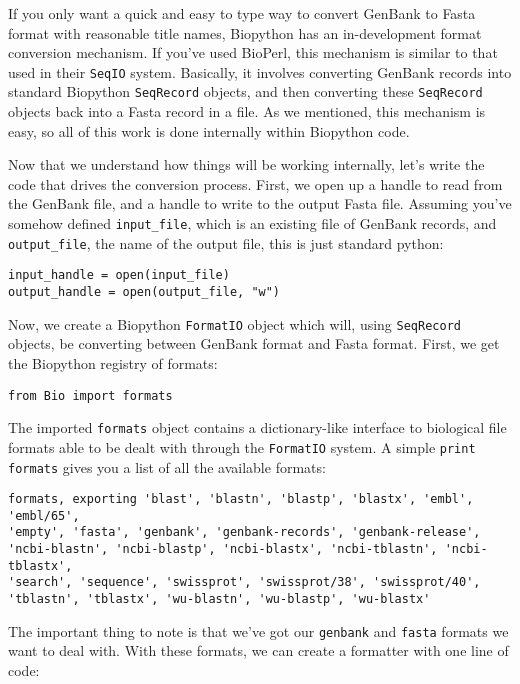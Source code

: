 \documentclass{article}
\begin{document}
If you only want a quick and easy to type way to convert GenBank to
Fasta format with reasonable title names, Biopython has an
in-development format conversion mechanism. If you've used BioPerl, this
mechanism is similar to that used in their \verb|SeqIO| system.
Basically, it involves converting GenBank records into standard
Biopython \verb|SeqRecord| objects, and then converting these
\verb|SeqRecord| objects back into a Fasta record in a file. As we
mentioned, this mechanism is easy, so all of this work is done
internally within Biopython code.

Now that we understand how things will be working internally, let's 
write the code that drives the conversion process.
First, we open up a handle to read from the GenBank file, and a handle
to write to the output Fasta file. Assuming you've somehow defined
\verb|input_file|, which is an existing file of GenBank records, and
\verb|output_file|, the name of the output file, this is just standard python:

\begin{verbatim}
input_handle = open(input_file)
output_handle = open(output_file, "w")
\end{verbatim}

Now, we create a Biopython \verb|FormatIO| object which will, using
\verb|SeqRecord| objects, be converting between GenBank format and Fasta
format. First, we get the Biopython registry of formats:

\begin{verbatim}
from Bio import formats
\end{verbatim}

The imported \verb|formats| object contains a dictionary-like interface to
biological file formats able to be dealt with through the
\verb|FormatIO| system. A simple \verb|print formats| gives you a list
of all the available formats:

\begin{verbatim}
formats, exporting 'blast', 'blastn', 'blastp', 'blastx', 'embl', 'embl/65', 
'empty', 'fasta', 'genbank', 'genbank-records', 'genbank-release', 
'ncbi-blastn', 'ncbi-blastp', 'ncbi-blastx', 'ncbi-tblastn', 'ncbi-tblastx', 
'search', 'sequence', 'swissprot', 'swissprot/38', 'swissprot/40', 
'tblastn', 'tblastx', 'wu-blastn', 'wu-blastp', 'wu-blastx'
\end{verbatim}

The important thing to note is that we've got our \verb|genbank| and
\verb|fasta| formats we want to deal with. With these formats, we can
create a formatter with one line of code:
\end{document}
